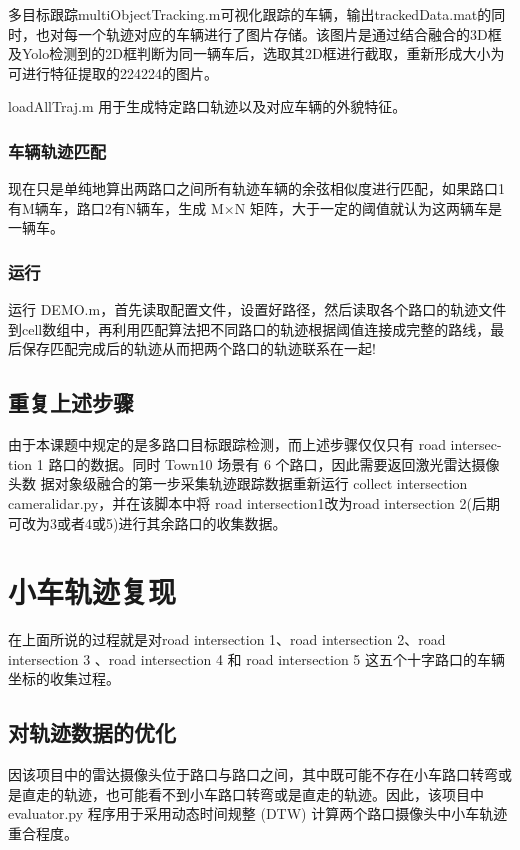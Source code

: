 多目标跟踪multiObjectTracking.m可视化跟踪的车辆，输出trackedData.mat的同时，也对每一个轨迹对应的车辆进行了图片存储。该图片是通过结合融合的3D框及Yolo检测到的2D框判断为同一辆车后，选取其2D框进行截取，重新形成大小为可进行特征提取的224\times224的图片。

loadAllTraj.m 用于生成特定路口轨迹以及对应车辆的外貌特征。

\subsubsection{车辆轨迹匹配}
现在只是单纯地算出两路口之间所有轨迹车辆的余弦相似度进行匹配，如果路口1有M辆车，路口2有N辆车，生成 M×N 矩阵，大于一定的阈值就认为这两辆车是一辆车。
\subsubsection{运行}
运行 DEMO.m，首先读取配置文件，设置好路径，然后读取各个路口的轨迹文件到cell数组中，再利用匹配算法把不同路口的轨迹根据阈值连接成完整的路线，最后保存匹配完成后的轨迹从而把两个路口的轨迹联系在一起!
\subsection{重复上述步骤}


由于本课题中规定的是多路口目标跟踪检测，而上述步骤仅仅只有 road intersec- tion 1 路口的数据。同时 Town10 场景有 6 个路口，因此需要返回激光雷达摄像头数 据对象级融合的第一步采集轨迹跟踪数据重新运行 collect intersection cameralidar.py，并在该脚本中将 road intersection1改为road intersection 2(后期可改为3或者4或5)进行其余路口的收集数据。










\section{小车轨迹复现}

在上面所说的过程就是对road intersection 1、road intersection 2、road intersection 3 、road intersection 4 和 road intersection 5 这五个十字路口的车辆坐标的收集过程。


\subsection{对轨迹数据的优化}
因该项目中的雷达摄像头位于路口与路口之间，其中既可能不存在小车路口转弯或是直走的轨迹，也可能看不到小车路口转弯或是直走的轨迹。因此，该项目中 evaluator.py 程序用于采用动态时间规整 (DTW) 计算两个路口摄像头中小车轨迹重合程度。
